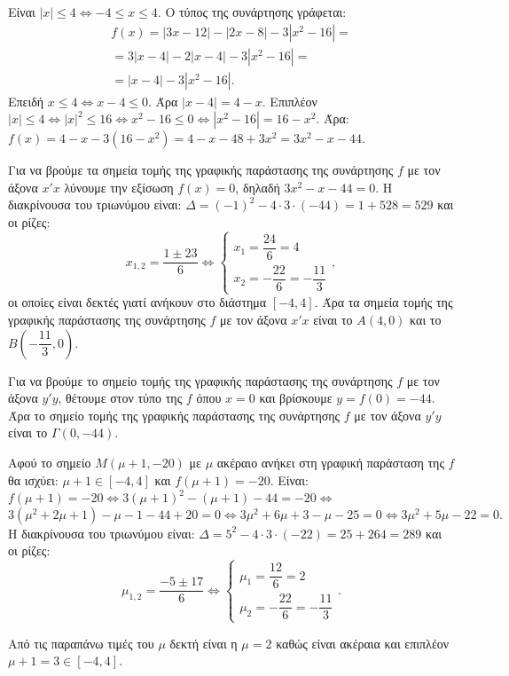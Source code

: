 
\begin{alist}
\item Είναι $|x| \le 4 \Leftrightarrow -4 \le x \le 4$.
Ο τύπος της συνάρτησης γράφεται:
\begin{gather*}
f(x) = |3x - 12| - |2x - 8| - 3|x^2 - 16| = \\
= 3|x - 4| - 2|x - 4| - 3|x^2 - 16| = \\
= |x - 4| - 3|x^2 - 16|.
\end{gather*}
Επειδή $x \le 4 \Leftrightarrow x - 4 \le 0$. Άρα $|x - 4| = 4 - x$.
Επιπλέον $|x| \le 4 \Leftrightarrow |x|^2 \le 16 \Leftrightarrow x^2 - 16 \le 0 \Leftrightarrow |x^2 - 16| = 16 - x^2$.
Άρα: $f(x) = 4 - x - 3(16 - x^2) = 4 - x - 48 + 3x^2 = 3x^2 - x - 44$.

\item 
\begin{rlist}
\item Για να βρούμε τα σημεία τομής της γραφικής παράστασης της συνάρτησης $f$ με τον
άξονα $x'x$ λύνουμε την εξίσωση $f(x) = 0$, δηλαδή $3x^2 - x - 44 = 0$.
Η διακρίνουσα του τριωνύμου είναι: $\Delta = (-1)^2 - 4 \cdot 3 \cdot (-44) = 1 + 528 = 529$ και οι ρίζες:
\[x_{1,2} = \dfrac{1 \pm 23}{6} \Leftrightarrow \begin{cases} x_1 = \dfrac{24}{6} = 4 \\ x_2 = -\dfrac{22}{6} = -\dfrac{11}{3} \end{cases},\]
οι οποίες είναι δεκτές γιατί ανήκουν στο διάστημα $[-4, 4]$.
Άρα τα σημεία τομής της γραφικής παράστασης της συνάρτησης $f$ με τον άξονα $x'x$ είναι
το $A(4, 0)$ και το $B\left(-\dfrac{11}{3}, 0\right)$.

Για να βρούμε το σημείο τομής της γραφικής παράστασης της συνάρτησης $f$ με τον άξονα
$y'y$, θέτουμε στον τύπο της $f$ όπου $x = 0$ και βρίσκουμε $y = f(0) = -44$.
Άρα το σημείο τομής της γραφικής παράστασης της συνάρτησης $f$ με τον άξονα $y'y$ είναι
το $\Gamma(0, -44)$.
\item Αφού το σημείο $M(\mu + 1, -20)$ με $\mu$ ακέραιο ανήκει στη γραφική παράσταση της $f$ θα ισχύει: $\mu + 1 \in [-4, 4]$ και $f(\mu + 1) = -20$.
Είναι: $f(\mu + 1) = -20 \Leftrightarrow 3(\mu + 1)^2 - (\mu + 1) - 44 = -20 \Leftrightarrow$
\[3(\mu^2 + 2\mu + 1) - \mu - 1 - 44 + 20 = 0 \Leftrightarrow 3\mu^2 + 6\mu + 3 - \mu - 25 = 0 \Leftrightarrow 3\mu^2 + 5\mu - 22 = 0.\]
Η διακρίνουσα του τριωνύμου είναι: $\Delta = 5^2 - 4 \cdot 3 \cdot (-22) = 25 + 264 = 289$ και οι ρίζες:
\[\mu_{1,2} = \dfrac{-5 \pm 17}{6} \Leftrightarrow \begin{cases} \mu_1 = \dfrac{12}{6} = 2 \\ \mu_2 = -\dfrac{22}{6} = -\dfrac{11}{3} \end{cases}.\]

Από τις παραπάνω τιμές του $\mu$ δεκτή είναι η $\mu = 2$ καθώς είναι ακέραια και επιπλέον $\mu + 1 = 3 \in [-4, 4]$.
\end{rlist}
\end{alist}

